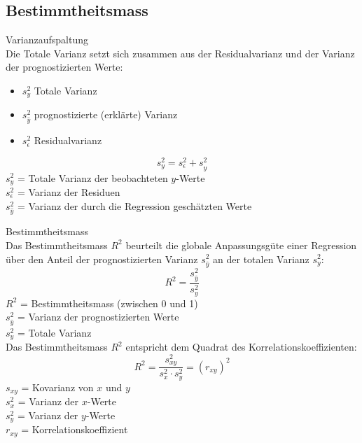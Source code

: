 \subsection{Bestimmtheitsmass}
\begin{concept}{Varianzaufspaltung}\\
Die Totale Varianz setzt sich zusammen aus der Residualvarianz und der Varianz der prognostizierten Werte:
\begin{itemize}
  \item $s_y^2$ Totale Varianz
  \item $s_{\hat{y}}^2$ prognostizierte (erklärte) Varianz
  \item $s_{\epsilon}^2$ Residualvarianz
\end{itemize}

$$
s_y^2=s_{\epsilon}^2+s_{\hat{y}}^2
$$
$s_y^2$ = Totale Varianz der beobachteten $y$-Werte\\
$s_{\epsilon}^2$ = Varianz der Residuen\\
$s_{\hat{y}}^2$ = Varianz der durch die Regression geschätzten Werte\\
\end{concept}

\begin{theorem}{Bestimmtheitsmass}\\
Das Bestimmtheitsmass $R^2$ beurteilt die globale Anpassungsgüte einer Regression über den Anteil der prognostizierten Varianz $s_{\hat{y}}^2$ an der totalen Varianz $s_y^2$:
$$
R^2=\frac{s_{\hat{y}}^2}{s_y^2}
$$
$R^2$ = Bestimmtheitsmass (zwischen 0 und 1)\\
$s_{\hat{y}}^2$ = Varianz der prognostizierten Werte\\
$s_y^2$ = Totale Varianz\\

Das Bestimmtheitsmass $R^2$ entspricht dem Quadrat des Korrelationskoeffizienten:
$$
R^2=\frac{s_{xy}^2}{s_x^2 \cdot s_y^2}=(r_{xy})^2
$$
$s_{xy}$ = Kovarianz von $x$ und $y$\\
$s_x^2$ = Varianz der $x$-Werte\\
$s_y^2$ = Varianz der $y$-Werte\\
$r_{xy}$ = Korrelationskoeffizient\\
\end{theorem}

